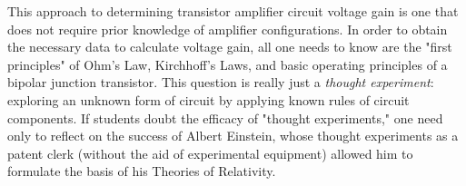 This approach to determining transistor amplifier circuit voltage gain is one that does not require prior knowledge of amplifier configurations.  In order to obtain the necessary data to calculate voltage gain, all one needs to know are the "first principles" of Ohm's Law, Kirchhoff's Laws, and basic operating principles of a bipolar junction transistor.  This question is really just a {\it thought experiment}: exploring an unknown form of circuit by applying known rules of circuit components.  If students doubt the efficacy of "thought experiments," one need only to reflect on the success of Albert Einstein, whose thought experiments as a patent clerk (without the aid of experimental equipment) allowed him to formulate the basis of his Theories of Relativity.




